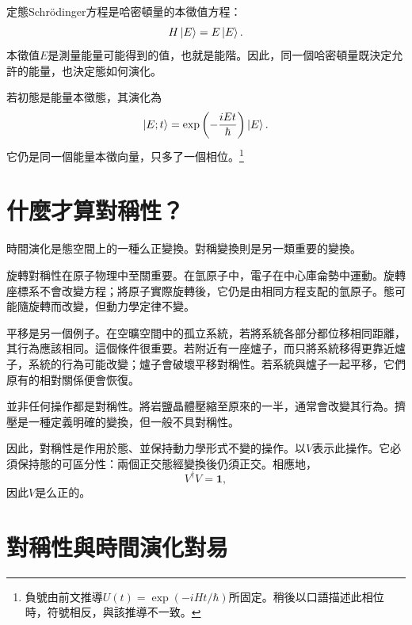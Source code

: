 定態Schr\"odinger方程是哈密頓量的本徵值方程：
\begin{equation}
H\left\lvert E\right\rangle=E\left\lvert E\right\rangle.
\end{equation}
本徵值\(E\)是測量能量可能得到的值，也就是能階。因此，同一個哈密頓量既決定允許的能量，也決定態如何演化。

若初態是能量本徵態，其演化為
\begin{equation}
\left\lvert E;t\right\rangle
=
\exp\left(-\frac{iEt}{\hbar}\right)\left\lvert E\right\rangle.
\end{equation}
它仍是同一個能量本徵向量，只多了一個相位。\footnote{負號由前文推導\(U(t)=\exp(-iHt/\hbar)\)所固定。稍後以口語描述此相位時，符號相反，與該推導不一致。}

\begin{classroomqa}
\end{classroomqa}

\section{什麼才算對稱性？}

時間演化是態空間上的一種么正變換。對稱變換則是另一類重要的變換。

旋轉對稱性在原子物理中至關重要。在氫原子中，電子在中心庫侖勢中運動。旋轉座標系不會改變方程；將原子實際旋轉後，它仍是由相同方程支配的氫原子。態可能隨旋轉而改變，但動力學定律不變。

平移是另一個例子。在空曠空間中的孤立系統，若將系統各部分都位移相同距離，其行為應該相同。這個條件很重要。若附近有一座爐子，而只將系統移得更靠近爐子，系統的行為可能改變；爐子會破壞平移對稱性。若系統與爐子一起平移，它們原有的相對關係便會恢復。

並非任何操作都是對稱性。將岩鹽晶體壓縮至原來的一半，通常會改變其行為。擠壓是一種定義明確的變換，但一般不具對稱性。

因此，對稱性是作用於態、並保持動力學形式不變的操作。以\(V\)表示此操作。它必須保持態的可區分性：兩個正交態經變換後仍須正交。相應地，
\begin{equation}
V^\dagger V=\mathbf 1,
\end{equation}
因此\(V\)是么正的。

\section{對稱性與時間演化對易}

